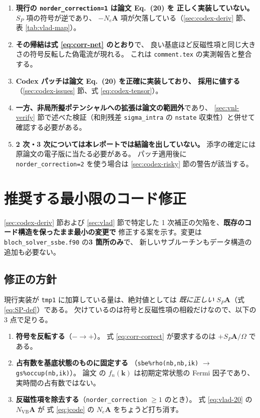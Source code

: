 \documentclass[dvipdfmx,a4paper,11pt]{jsarticle}
\newcommand{\file}[1]{\texttt{#1}}
\newcommand{\vk}{\bm{k}}
\newcommand{\vA}{\bm{A}}
\begin{document}
\begin{enumerate}
\item \textbf{現行の \file{norder\_correction=1} は論文 Eq.~(20) を
      正しく実装していない。} $S_P$ 項の符号が逆であり、
      $-N_e\vA$ 項が欠落している（\ref{sec:codex-deriv} 節、
      表 \ref{tab:vlad-map}）。
\item \textbf{その帰結は式 \eqref{eq:corr-net} のとおり}で、
      良い基底ほど反磁性項と同じ大きさの符号反転した偽電流が現れる。
      これは \file{comment.tex} の実測報告と整合する。
\item \textbf{Codex パッチは論文 Eq.~(20) を正確に実装しており、
      採用に値する}（\ref{sec:codex-issues} 節、式 \eqref{eq:codex-tensor}）。
\item \textbf{一方、非局所擬ポテンシャルへの拡張は論文の範囲外}であり、
      \ref{sec:vnl-verify} 節で述べた検証（和則残差 \verb|sigma_intra| の
      \file{nstate} 収束性）と併せて確認する必要がある。
\item \textbf{2 次・3 次については本レポートでは結論を出していない。}
      添字の確定には原論文の電子版に当たる必要がある。
      パッチ適用後に \file{norder\_correction=2} を使う場合は
      \ref{sec:codex-risky} 節の警告が該当する。
\end{enumerate}

\section{推奨する最小限のコード修正}
\label{sec:patch}

\ref{sec:codex-deriv} 節および \ref{sec:vlad} 節で特定した
1 次補正の欠陥を、\textbf{既存のコード構造を保ったまま最小の変更で}
修正する案を示す。変更は \file{bloch\_solver\_ssbe.f90} の\textbf{3 箇所のみ}で、
新しいサブルーチンもデータ構造の追加も必要ない。

\subsection{修正の方針}

現行実装が \verb|tmp1| に加算している量は、絶対値としては
\emph{既に正しい} $S_P\vA$（式 \eqref{eq:SP-def}）である。
欠けているのは符号と反磁性項の相殺だけなので、以下の 3 点で足りる。

\begin{enumerate}
\item \textbf{符号を反転する}（$-\to+$）。
      式 \eqref{eq:corr-correct} が要求するのは $+S_P\vA/\Omega$ である。
\item \textbf{占有数を基底状態のものに固定する}
      （\verb|sbe%rho(nb,nb,ik)| $\to$ \verb|gs%occup(nb,ik)|）。
      論文 \cite{yakovlev2017} の $f_n(\vk)$ は初期定常状態の
      Fermi 因子であり、実時間の占有数ではない。
\item \textbf{反磁性項を除去する}（\file{norder\_correction} $\ge 1$ のとき）。
      式 \eqref{eq:vlad-20} の $N_{\mathrm{VB}}\vA$ が
      式 \eqref{eq:jcode} の $N_e\vA$ をちょうど打ち消す。
\end{enumerate}
\end{document}
